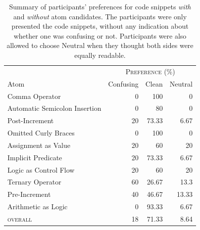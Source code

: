 \begin{table}[!htb]
    \centering
    \caption{Summary of participants' preferences for code snippets \emph{with} and
      \emph{without} atom candidates. The participants were only presented the code snippets, without any indication about whether one was confusing or not. 
      Participants were also allowed to choose Neutral when they thought both sides were equally readable.}
    \begin{tabular}{lrrr}\toprule
      & \multicolumn{3}{c}{\textsc{Preference (\%)}} \\
      \cmidrule(lr){2-4}
         Atom           & \multicolumn{1}{c}{Confusing}
                                      &  \multicolumn{1}{c}{Clean}
                                               & \multicolumn{1}{c}{Neutral} \\ \midrule
         Comma Operator                  & 0  & 100    & 0     \\
         Automatic Semicolon Insertion  & 0  & 80     & 0     \\
         Post-Increment                  & 20 & 73.33  & 6.67  \\
         Omitted Curly Braces            & 0  & 100    & 0     \\
         Assignment as Value             & 20 & 60     & 20    \\
         Implicit Predicate              & 20 & 73.33  & 6.67  \\
         Logic as Control Flow           & 20 & 60     & 20    \\
         Ternary Operator                & 60 & 26.67  & 13.3  \\
         Pre-Increment                   & 40 & 46.67  & 13.33 \\ 
         Arithmetic as Logic             & 0  & 93.33  & 6.67  \\ \midrule
         \textsc{overall}                & 18 & 71.33  & 8.64  \\
         \bottomrule
    \end{tabular}
    \label{tab:interview-results1}
\end{table}


